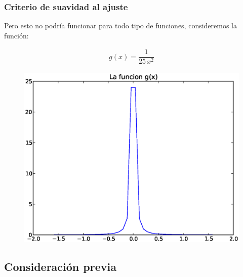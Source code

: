 \documentclass[12pt]{beamer}
\begin{document}
\begin{frame}
\frametitle{Criterio de suavidad al ajuste}
Pero esto no podría funcionar para todo tipo de funciones, consideremos la función:
\\
\medskip
\pause
\begin{minipage}{3cm}
\begin{align*}
g(x) = \dfrac{1}{25 \, x^{2}}
\end{align*}
\end{minipage}
\hspace{0.5cm}
\begin{minipage}{6cm}
\begin{figure}
	\centering
	 \includegraphics[scale=0.3]{Imagenes/grafica02.eps}  
\end{figure}
\end{minipage}
\end{frame}

\subsection{Consideración previa}
\end{document}
